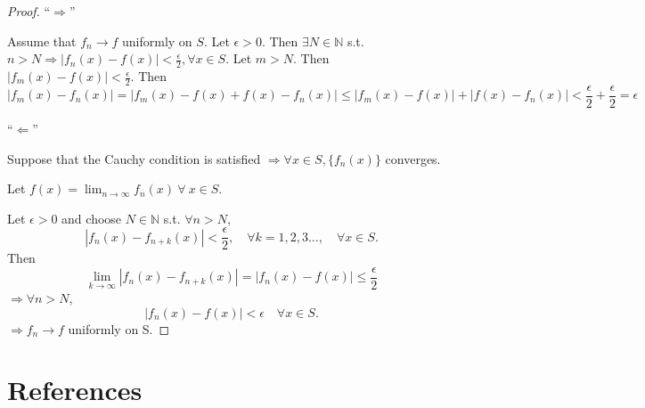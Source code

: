 \documentclass[twoside]{article}
\newcommand\imp{$\Longrightarrow$}
\begin{document}
\begin{proof}
    ``\imp''

    Assume that $f_n \to f$ uniformly on $S$. Let $\epsilon >0$. Then $\exists N \in \mathbb{N}$ s.t. $n > N \Longrightarrow |f_n(x) - f(x)| < \frac{\epsilon}{2}, \forall x \in S$. Let $m >N$. Then $|f_m(x) - f(x)| < \frac{\epsilon}{2}$. Then 
    \[
    |f_m(x) - f_n(x)| = |f_m(x) - f(x) + f(x)- f_n(x)| \leq |f_m(x) - f(x)| + |f(x)- f_n(x)| < \frac{\epsilon}{2} + \frac{\epsilon}{2} = \epsilon
    \]

    ``$\Longleftarrow$''

    Suppose that the Cauchy condition is satisfied \imp $\forall x \in S, \{f_n(x)\}$ converges. 

    Let $f(x) = \lim_{n \to \infty} f_{n}(x) ~\forall~x \in S$.

    Let $\epsilon > 0$ and choose $N \in \mathbb{N}$ s.t. $\forall n > N$, \[
    |f_n(x) - f_{n+k}(x)| < \frac{\epsilon}{2}, \quad \forall k = 1,2,3 ..., \quad \forall x \in S.
    \]
    Then \[
    \lim_{k \to \infty} |f_n(x) - f_{n+k}(x)| = |f_n(x) - f(x)| \leq \frac{\epsilon}{2}
    \]
    \imp $\forall n > N$,
    \[
    |f_n(x) - f(x)| < \epsilon \quad \forall x \in S.
    \]
    \imp $f_n \to f$ uniformly on S.
\end{proof}








\clearpage
\section*{References}

\end{document}
